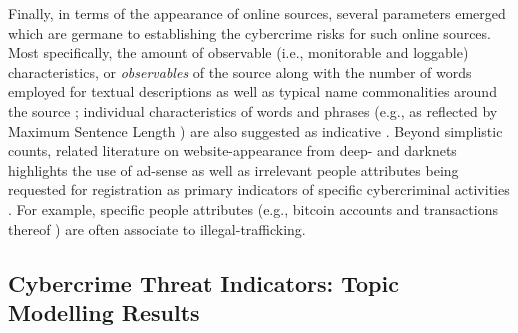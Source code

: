 Finally, in terms of the appearance of online sources, several parameters emerged which are germane to establishing the cybercrime risks for such online sources. Most specifically, the amount of observable (i.e., monitorable and loggable) characteristics, or \emph{observables} \cite{NabkiFAP17} of the source along with the number of words employed for textual descriptions as well as typical name commonalities \cite{} around the source \cite{SkopikSF16,NaritaKOBT16}; individual characteristics of words and phrases (e.g., as reflected by Maximum Sentence Length \cite{Bailey2006PracticalDM}) are also suggested as indicative \cite{YangSZW07}. Beyond simplistic counts, related literature on website-appearance from deep- and darknets highlights the use of ad-sense as well as irrelevant people attributes \cite{WangWSTGCJ18} being requested for registration as primary indicators of specific cybercriminal activities \cite{YangSZW07}. For example, specific people attributes (e.g., bitcoin accounts and transactions thereof \cite{Khelghati16}) are often associate to illegal-trafficking.

\subsection{Cybercrime Threat Indicators: Topic Modelling Results}


